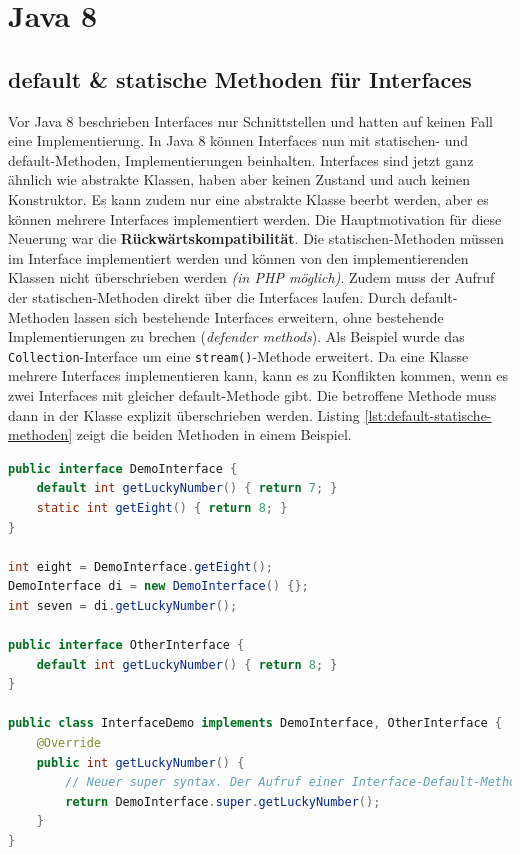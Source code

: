 \chapter{Java 8}

\section{default \& statische Methoden für Interfaces}

Vor Java 8 beschrieben Interfaces nur Schnittstellen und hatten auf keinen Fall eine Implementierung. In Java 8 können Interfaces nun mit statischen- und default-Methoden, Implementierungen beinhalten. Interfaces sind jetzt ganz ähnlich wie abstrakte Klassen, haben aber keinen Zustand und auch keinen Konstruktor. Es kann zudem nur eine abstrakte Klasse beerbt werden, aber es können mehrere Interfaces implementiert werden. Die Hauptmotivation für diese Neuerung war die \textbf{Rückwärtskompatibilität}. Die statischen-Methoden müssen im Interface implementiert werden und können von den implementierenden Klassen nicht überschrieben werden \textit{(in PHP möglich)}. Zudem muss der Aufruf der statischen-Methoden direkt über die Interfaces laufen. Durch default-Methoden lassen sich bestehende Interfaces erweitern, ohne bestehende Implementierungen zu brechen (\textit{defender methods}). Als Beispiel wurde das \verb|Collection|-Interface um eine \verb|stream()|-Methode erweitert. Da eine Klasse mehrere Interfaces implementieren kann, kann es zu Konflikten kommen, wenn es zwei Interfaces mit gleicher default-Methode gibt. Die betroffene Methode muss dann in der Klasse explizit überschrieben werden. Listing \ref{lst:default-statische-methoden} zeigt die beiden Methoden in einem Beispiel.

\begin{lstlisting}[language=Java, caption=Default- und statische Methoden, label=lst:default-statische-methoden]
public interface DemoInterface {
	default int getLuckyNumber() { return 7; }
	static int getEight() { return 8; }
}

int eight = DemoInterface.getEight();
DemoInterface di = new DemoInterface() {};
int seven = di.getLuckyNumber();

public interface OtherInterface {
	default int getLuckyNumber() { return 8; }
}

public class InterfaceDemo implements DemoInterface, OtherInterface {
	@Override
	public int getLuckyNumber() {
		// Neuer super syntax. Der Aufruf einer Interface-Default-Methode von einer implementierende Klasse aus, muss so erfolgen. Der folgende Aufruf, ausserhalb einer implementieren Klasse, funktioniert nicht.
		return DemoInterface.super.getLuckyNumber();
	} 
}
\end{lstlisting}

